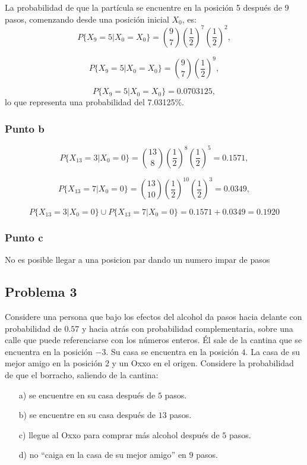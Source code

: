 \documentclass{article}
\begin{document}
La probabilidad de que la partícula se encuentre en la posición 5 después de 9 pasos, comenzando desde una posición inicial \(X_0\), es:
\[
    P\{X_9 = 5 | X_0 = X_0\} = \binom{9}{7} \left(\frac{1}{2}\right)^{7} \left(\frac{1}{2}\right)^{2},
\]

\[
    P\{X_9 = 5 | X_0 = X_0\} = \binom{9}{7} \left(\frac{1}{2}\right)^{9},
\]

\[
    P\{X_9 = 5 | X_0 = X_0\} = 0.0703125,
\]
lo que representa una probabilidad del 7.03125\%.

\subsubsection*{Punto b}

\[
    P\{X_{13} = 3 | X_0 = 0\} = \binom{13}{8} \left(\frac{1}{2}\right)^{8} \left(\frac{1}{2}\right)^{5} = 0.1571,
\]

\[
    P\{X_{13} =7 | X_0 = 0\} = \binom{13}{10} \left(\frac{1}{2}\right)^{10} \left(\frac{1}{2}\right)^{3} = 0.0349,
\]

\[
    P\{X_{13} = 3 | X_0 = 0\} \cup  P\{X_{13} =7 | X_0 = 0\} = 0.1571 + 0.0349 = 0.1920
\]

\subsubsection*{Punto c}

No es posible llegar a una posicion par dando un numero impar de pasos

\subsection*{Problema 3}

Considere una persona que bajo los efectos del alcohol da pasos hacia
delante con probabilidad de $0.57$ y hacia atrás con probabilidad
complementaria, sobre una calle que puede referenciarse con los números
enteros. Él sale de la cantina que se encuentra en la posición $-3$. Su casa se
encuentra en la posición $4$. La casa de su mejor amigo en la posición $2$ y un
Oxxo en el origen. Considere la probabilidad de que el borracho, saliendo de
la cantina:

\begin{itemize}
    \item[a)] se encuentre en su casa después de $5$ pasos.
    \item[b)] se encuentre en su casa después de $13$ pasos.
    \item[c)] llegue al Oxxo para comprar más alcohol después de $5$ pasos.
    \item[d)] no ``caiga en la casa de su mejor amigo'' en $9$ pasos.
\end{itemize}
\end{document}
